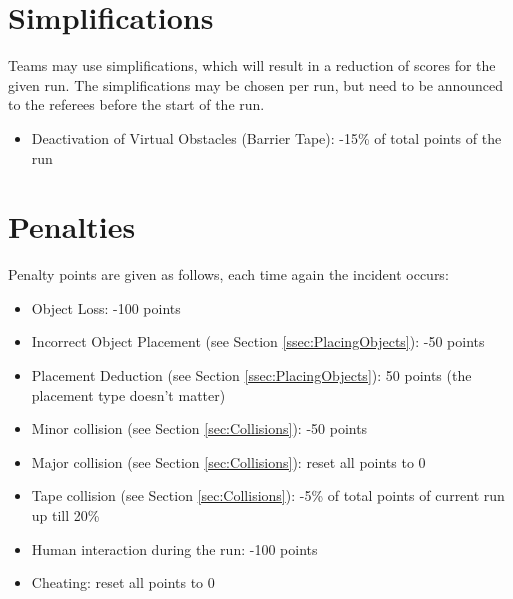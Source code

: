 \section{Simplifications}
Teams may use simplifications, which will result in a reduction of scores for the given run. The simplifications may be chosen per run, but need to be announced to the referees before the start of the run.

\begin{itemize}
  \item Deactivation of Virtual Obstacles (Barrier Tape): -15\% of total points of the run
\end{itemize}


\section{Penalties}
\label{sec:penalties}
Penalty points are given as follows, each time again the incident occurs:

\begin{itemize}
	\item Object Loss: \hfill -100 points
	\item Incorrect Object Placement (see Section \ref{ssec:PlacingObjects}): \hfill -50 points
	\item Placement Deduction (see Section \ref{ssec:PlacingObjects}): \hfill 50 points (the placement type doesn't matter)
	\item Minor collision (see Section \ref{sec:Collisions}): \hfill -50 points
	\item Major collision (see Section \ref{sec:Collisions}): \hfill reset all points to 0
  \item Tape collision (see Section \ref{sec:Collisions}): \hfill -5\% of total points of current run up till
  20\%
  \item Human interaction during the run: \hfill  -100 points
  \item Cheating: \hfill reset all points to 0
\end{itemize}


